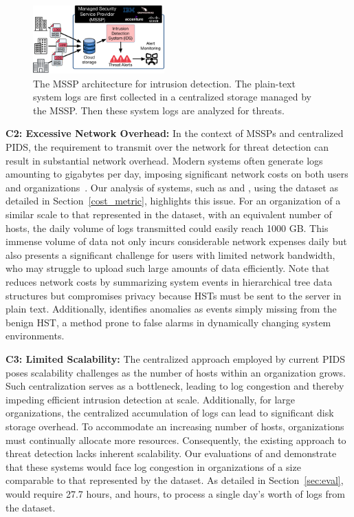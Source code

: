 \begin{figure}[t!]
    \centering
    \includegraphics[width=0.45\textwidth]{fig/mssp.pdf}
    \caption{The MSSP architecture for intrusion detection. The plain-text system logs are first collected in a centralized storage managed by the MSSP. Then these system logs are analyzed for threats.}
    \label{mssp}
    \vspace{-4ex}
  \end{figure}
    
\smallskip
\noindent
\textbf{C2: Excessive Network Overhead:} In the context of MSSPs and centralized PIDS, the requirement to transmit \logs over the network for threat detection can result in substantial network overhead. Modern systems often generate logs amounting to gigabytes per day, imposing significant network costs on both users and organizations~\cite{inam2023sok,hossain+depend}. Our analysis of systems, such as \flash and \kairos, using the \optc dataset as detailed in Section~\ref{cost_metric}, highlights this issue. For an organization of a similar scale to that represented in the \optc dataset, with an equivalent number of hosts, the daily volume of logs transmitted could easily reach 1000 GB. This immense volume of data not only incurs considerable network expenses daily but also presents a significant challenge for users with limited network bandwidth, who may struggle to upload such large amounts of data efficiently. Note that \disdet reduces network costs by summarizing system events in hierarchical tree data structures but compromises privacy because HSTs must be sent to the server in plain text. Additionally, \disdet identifies anomalies as events simply missing from the benign HST, a method prone to false alarms in dynamically changing system environments.


\smallskip
\noindent
\textbf{C3: Limited Scalability:} The centralized approach employed by current PIDS poses scalability challenges as the number of hosts within an organization grows. Such centralization serves as a bottleneck, leading to log congestion and thereby impeding efficient intrusion detection at scale. Additionally, for large organizations, the centralized accumulation of logs can lead to significant disk storage overhead. To accommodate an increasing number of hosts, organizations must continually allocate more resources. Consequently, the existing approach to threat detection lacks inherent scalability. Our evaluations of \flash and \kairos demonstrate that these systems would face log congestion in organizations of a size comparable to that represented by the \optc dataset. As detailed in Section~\ref{sec:eval}, \flash would require 27.7 hours, and  hours, to process a single day's worth of logs from the \optc dataset.

